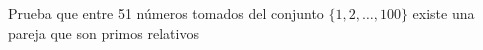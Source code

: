 \begin{problem}
    [\cite{112CP}]
    Prueba que entre 51 n\'umeros tomados del conjunto 
    $\{ 1,2,\ldots, 100 \}$ existe una pareja
    que son primos relativos
    \label{112CP155} 
\end{problem}